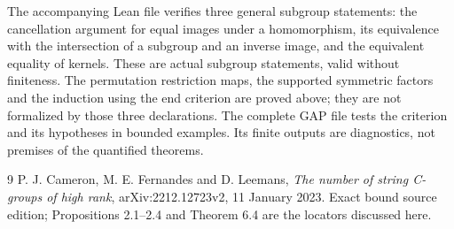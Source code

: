 \documentclass[a4paper,11pt]{article}
\begin{document}
The accompanying Lean file verifies three general subgroup statements:
the cancellation argument for equal images under a homomorphism, its
equivalence with the intersection of a subgroup and an inverse image,
and the equivalent equality of kernels. These are actual subgroup
statements, valid without finiteness. The permutation restriction maps,
the supported symmetric factors and the induction using the end criterion
are proved above; they are not formalized by those three declarations.
The complete GAP file tests the criterion and its hypotheses in bounded
examples. Its finite outputs are diagnostics, not premises of the
quantified theorems.
\begin{thebibliography}{9}
 P. J. Cameron, M. E. Fernandes and D. Leemans,
\emph{The number of string C-groups of high rank},
arXiv:2212.12723v2, 11 January 2023. Exact bound source edition;
Propositions 2.1--2.4 and Theorem 6.4 are the locators discussed here.
\end{thebibliography}
\end{document}

